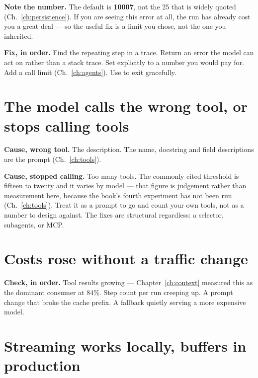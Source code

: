 \textbf{Note the number.} The default is \textbf{10007}, not the 25 that is
widely quoted (Ch.~\ref{ch:persistence}). If you are seeing this error at all,
the run has already cost you a great deal --- so the useful fix is a limit you
chose, not the one you inherited.

\textbf{Fix, in order.} Find the repeating step in a trace. Return an error the
model can act on rather than a stack trace. Set 
explicitly to a number you would pay for. Add a call limit
(Ch.~\ref{ch:agents}). Use  to exit gracefully.

\section{The model calls the wrong tool, or stops calling tools}
\label{sec:tsJ}

\textbf{Cause, wrong tool.} The description. The name, docstring and field
descriptions are the prompt (Ch.~\ref{ch:tools}).

\textbf{Cause, stopped calling.} Too many tools. The commonly cited threshold is
fifteen to twenty and it varies by model --- that figure is judgement rather
than measurement here, because the book's fourth experiment has not been run
(Ch.~\ref{ch:tools}). Treat it as a prompt to go and count your own tools, not
as a number to design against. The fixes are structural regardless: a selector,
subagents, or MCP.

\section{Costs rose without a traffic change}
\label{sec:tsK}

\textbf{Check, in order.} Tool results growing --- Chapter~\ref{ch:context}
measured this as the dominant consumer at 84\%. Step count per run creeping up. A
prompt change that broke the cache prefix. A fallback quietly serving a more
expensive model.

\section{Streaming works locally, buffers in production}
\label{sec:tsL}

